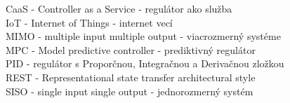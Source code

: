 CaaS - Controller as a Service - regulátor ako služba \\
IoT - Internet of Things - internet vecí \\
MIMO - multiple input multiple output - viacrozmerný systéme \\
MPC - Model predictive controller - prediktivný regulátor \\
PID - regulátor s Proporčnou, Integračnou a Derivačnou zložkou \\
REST - Representational state transfer architectural style \\
SISO - single input single output - jednorozmerný systém
